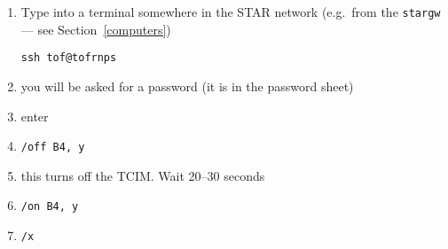 \begin{enumerate}
\item Type into a terminal somewhere in the STAR network (e.g.\ from the \texttt{stargw} --- see Section~\ref{computers})
\begin{verbatim}
ssh tof@tofrnps
\end{verbatim}
\item you will be asked for a password (it is in the password sheet)
\item enter
\item \verb=/off B4, y=
\item this turns off the TCIM\@. Wait 20--30 seconds
\item \verb=/on B4, y=
\item \verb=/x=
\end{enumerate}

